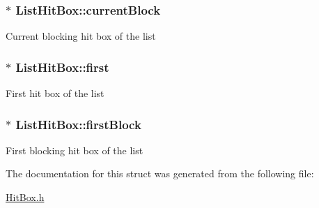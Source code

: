 \subsubsection[{\texorpdfstring{current\+Block}{currentBlock}}]{$\ast$ List\+Hit\+Box\+::current\+Block}\hypertarget{structListHitBox_a5ecee29db2078182f88247b05cf13636}{}\label{structListHitBox_a5ecee29db2078182f88247b05cf13636}
Current blocking hit box of the list 
\subsubsection[{\texorpdfstring{first}{first}}]{$\ast$ List\+Hit\+Box\+::first}\hypertarget{structListHitBox_ad74444cd226717237814eaeac80a875f}{}\label{structListHitBox_ad74444cd226717237814eaeac80a875f}
First hit box of the list 
\subsubsection[{\texorpdfstring{first\+Block}{firstBlock}}]{$\ast$ List\+Hit\+Box\+::first\+Block}\hypertarget{structListHitBox_a2086de15780fff764e013223601b8455}{}\label{structListHitBox_a2086de15780fff764e013223601b8455}
First blocking hit box of the list 

The documentation for this struct was generated from the following file\+:\begin{DoxyCompactItemize}
\item 
\hyperlink{HitBox_8h}{Hit\+Box.\+h}\end{DoxyCompactItemize}
